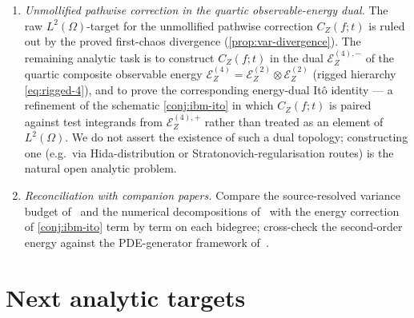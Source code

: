 \documentclass[11pt,reqno]{amsart}
\theoremstyle{plain}
\theoremstyle{definition}
\theoremstyle{remark}
\newcommand{\Energy}{\mathcal{E}}
\newcommand{\IBM}{Z}
\begin{document}
\begin{enumerate}
\item \emph{Unmollified pathwise correction in the quartic
  observable-energy dual.} The raw $L^{2}(\Omega)$-target for the
  unmollified pathwise correction $C_\IBM(f;t)$ is ruled out by the
  proved first-chaos divergence (\cref{prop:var-divergence}). The
  remaining analytic task is to construct $C_\IBM(f;t)$ in the dual
  $\Energy_\IBM^{(4),-}$ of the quartic composite observable energy
  $\Energy_\IBM^{(4)}=\Energy_\IBM^{(2)}\otimes\Energy_\IBM^{(2)}$
  (rigged hierarchy \eqref{eq:rigged-4}), and to prove the
  corresponding energy-dual It\^o identity --- a refinement of the
  schematic \cref{conj:ibm-ito} in which $C_\IBM(f;t)$ is paired
  against test integrands from $\Energy_\IBM^{(4),+}$ rather than
  treated as an element of $L^{2}(\Omega)$. We do not assert the
  existence of such a dual topology; constructing one (e.g.\ via
  Hida-distribution or Stratonovich-regularisation routes) is the
  natural open analytic problem.

\item \emph{Reconciliation with companion papers.} Compare the
  source-resolved variance budget of~\cite{Fontes-IBMchaos} and the
  numerical decompositions of~\cite{Fontes-IBMnumerical} with the
  energy correction of \cref{conj:ibm-ito} term by term on each
  bidegree; cross-check the second-order energy against the
  PDE-generator framework of~\cite{Fontes-PDEgenerators}.
\end{enumerate}

\section*{Next analytic targets}
\end{document}
